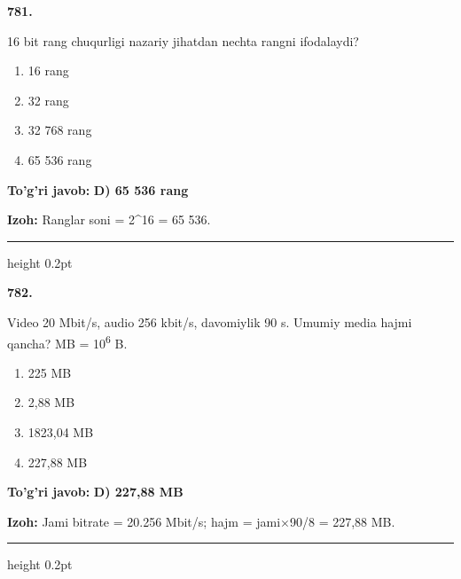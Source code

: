 \documentclass[10pt,a4paper,oneside]{article}
\begin{document}
\noindent\textbf{\color{ink}781.}
\par
16 bit rang chuqurligi nazariy jihatdan nechta rangni ifodalaydi?
\begin{enumerate}[label=\Alph*),leftmargin=9mm]
\item 16 rang
\item 32 rang
\item 32 768 rang
\item 65 536 rang
\end{enumerate}
\begin{tcolorbox}[enhanced,breakable,colback=teal!4,colframe=teal!50!black,boxrule=0.5pt,arc=1.1mm,left=3mm,right=3mm,top=1.7mm,bottom=1.7mm,before skip=2mm,after skip=2mm]
\textbf{\color{teal}To'g'ri javob:} \textbf{D) 65 536 rang}
\par\smallskip
\textbf{Izoh:} Ranglar soni = 2\textasciicircum{}16 = 65 536.
\end{tcolorbox}
\vspace{2mm}\hrule height 0.2pt \vspace{3mm}

\noindent\textbf{\color{ink}782.}
\par
Video 20 Mbit/s, audio 256 kbit/s, davomiylik 90 s. Umumiy media hajmi qancha? MB = 10\textsuperscript{6} B.
\begin{enumerate}[label=\Alph*),leftmargin=9mm]
\item 225 MB
\item 2,88 MB
\item 1823,04 MB
\item 227,88 MB
\end{enumerate}
\begin{tcolorbox}[enhanced,breakable,colback=teal!4,colframe=teal!50!black,boxrule=0.5pt,arc=1.1mm,left=3mm,right=3mm,top=1.7mm,bottom=1.7mm,before skip=2mm,after skip=2mm]
\textbf{\color{teal}To'g'ri javob:} \textbf{D) 227,88 MB}
\par\smallskip
\textbf{Izoh:} Jami bitrate = 20.256 Mbit/s; hajm = jami\ensuremath{\times}90/8 = 227,88 MB.
\end{tcolorbox}
\vspace{2mm}\hrule height 0.2pt \vspace{3mm}
\end{document}
